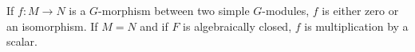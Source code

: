 If $f: M \rightarrow N$ is a $G$-morphism between two simple $G$-modules, $f$ is either zero or an isomorphism. If $M = N$ and if $F$ is algebraically closed, $f$ is multiplication by a scalar.

